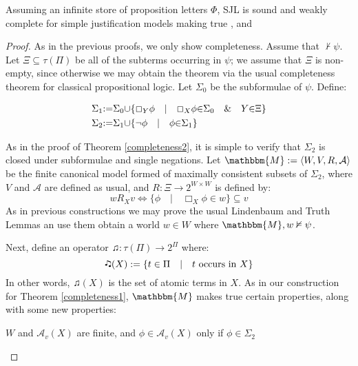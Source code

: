 \begin{theorem}
  \label{completeness5}Assuming an infinite store of proposition letters
  $\Phi$, SJL is sound and weakly complete for simple justification models
  making true ,  and 
\end{theorem}

\begin{proof}
  As in the previous proofs, we only show completeness.  Assume that $\nvdash
  \psi$.  Let $\Xi \subseteq \tau (\Pi)$ be all of the subterms occurring in
  $\psi$; we assume that $\Xi$ is non-empty, since otherwise we may obtain the
  theorem via the usual completeness theorem for classical propositional
  logic. Let $\Sigma_0$ be the subformulae of $\psi$.  Define:
  
  \begin{align*}
    {\Sigma}_1 &
    {:=}{\Sigma}_0{\cup}\{\Box_Y{\phi}{\hspace{1em}}|{\hspace{1em}}\Box_X{\phi}{\in}{\Sigma}_0{\hspace{1em}}\&{\hspace{1em}}Y{\in}{\Xi}\}\\
    {\Sigma}_2 &
    {:=}{\Sigma}_1{\cup}\{{\neg}{\phi}{\hspace{1em}}|{\hspace{1em}}{\phi}{\in}{\Sigma}_1\}
  \end{align*}
  
  As in the proof of Theorem \ref{completeness2}, it is simple to verify that
  $\Sigma_2$ is closed under subformulae and single negations.  Let
  $\mathbbm{M} \assign \langle W, V, R, \mathcal{A} \rangle$ be the finite
  canonical model formed of maximally consistent subsets of $\Sigma_2$, where
  $V$ and $\mathcal{A}$ are defined as usual, and $R : \Xi \rightarrow 2^{W
  \times W}$ is defined by:
  \[ w R_X v \Longleftrightarrow \{\phi \hspace{1em} | \hspace{1em} \Box_X
     \phi \in w\} \subseteq v \]
  As in previous constructions we may prove the usual Lindenbaum and Truth
  Lemmas an use them obtain a world $w \in W$ where $\mathbbm{M}, w \nvDash
  \psi$.
  
  
  
  Next, define an operator $\twonotes : \tau (\Pi) \rightarrow 2^{\Pi}$ where:
  \[ \twonotes (X) \assign \{t \in \Pi \hspace{1em} | \hspace{1em} t \text{
     occurs in } X\} \]
  In other words, $\twonotes (X)$ is the set of atomic terms in $X$.  As in
  our construction for Theorem \ref{completeness1}, $\mathbbm{M}$ makes true
  certain properties, along with some new properties:
  \begin{enumeratenumeric}
    \item \label{fin}$W$ and $\mathcal{A}_v (X)$ are finite, and $\phi \in
    \mathcal{A}_v (X)$ only if $\phi \in \Sigma_2$
    

\end{enumeratenumeric}
\end{proof}
